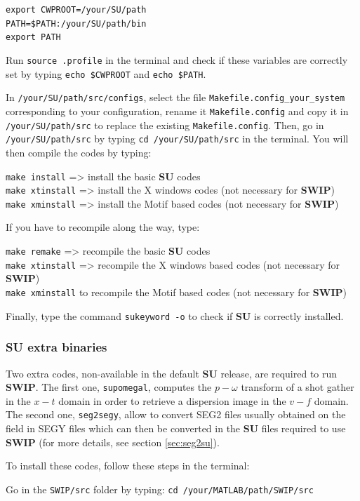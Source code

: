 \documentclass[twoside,a4paper]{article}
\def\SWIP{\textbf{SWIP}}
\def\SU{\textbf{SU}}
\begin{document}
\verb|export CWPROOT=/your/SU/path|\\
\verb|PATH=$PATH:/your/SU/path/bin|\\
\verb|export PATH|

Run \verb|source .profile| in the terminal and check if these variables are correctly set by typing \verb|echo $CWPROOT| and \verb|echo $PATH|.

In \verb|/your/SU/path/src/configs|, select the file \verb|Makefile.config_your_system| corresponding to your configuration, rename it \verb|Makefile.config| and copy it in \verb|/your/SU/path/src| to replace the existing \verb|Makefile.config|. Then, go in \verb|/your/SU/path/src| by typing \verb|cd /your/SU/path/src| in the terminal. You will then compile the codes by typing:

\verb|make install| => install the basic {\SU} codes\\
\verb|make xtinstall| => install the X windows codes (not necessary for {\SWIP})\\
\verb|make xminstall| => install the Motif based codes (not necessary for {\SWIP})

If you have to recompile along the way, type:

\verb|make remake| => recompile the basic {\SU} codes\\
\verb|make xtinstall| => recompile the X windows based codes (not necessary for {\SWIP})\\
\verb|make xminstall| to recompile the Motif based codes (not necessary for {\SWIP})

Finally, type the command \verb|sukeyword -o| to check if {\SU} is correctly installed.

\subsubsection{SU extra binaries}
Two extra codes, non-available in the default {\SU} release, are required to run {\SWIP}. The first one, \verb|supomegal|, computes the $p-\omega$ transform of a shot gather in the $x-t$ domain in order to retrieve a dispersion image in the $v-f$ domain. The second one, \verb|seg2segy|, allow to convert SEG2 files usually obtained on the field in SEGY files which can then be converted in the {\SU} files required to use {\SWIP} (for more details, see section \ref{sec:seg2su}).

To install these codes, follow these steps in the terminal:

Go in the \verb|SWIP/src| folder by typing: \verb|cd /your/MATLAB/path/SWIP/src|
\end{document}

